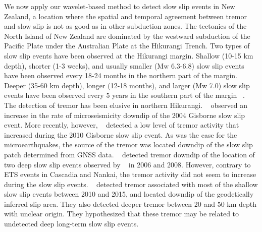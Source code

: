 \documentclass{article}
\begin{document}
We now apply our wavelet-based method to detect slow slip events in New Zealand, a location where the spatial and temporal agreement between tremor and slow slip is not as good as in other subduction zones. The tectonics of the North Island of New Zealand are dominated by the westward subduction of the Pacific Plate under the Australian Plate at the Hikurangi Trench. Two types of slow slip events have been observed at the Hikurangi margin. Shallow (10-15 km depth), shorter (1-3 weeks), and usually smaller (Mw 6.3-6.8) slow slip events have been observed every 18-24 months in the northern part of the margin. Deeper (35-60 km depth), longer (12-18 months), and larger (Mw 7.0) slow slip events have been observed every 5 years in the southern part of the margin ~\citep{WAL_2010,TOD_2016}. The detection of tremor has been elusive in northern Hikurangi. ~\citet{DEL_2009} observed an increase in the rate of microseismicity downdip of the 2004 Gisborne slow slip event. More recently, however, ~\citep{KIM_2011} detected a low level of tremor activity that increased during the 2010 Gisborne slow slip event. As was the case for the microearthquakes, the source of the tremor was located downdip of the slow slip patch determined from GNSS data. ~\citep{IDE_2012} detected tremor downdip of the location of two deep slow slip events observed by ~\citet{WAL_2013} in 2006 and 2008. However, contrary to ETS events in Cascadia and Nankai, the tremor activity did not seem to increase during the slow slip events. ~\citet{TOD_2016}  detected tremor associated with most of the shallow slow slip events between 2010 and 2015, and located downdip of the geodetically inferred slip area. They also detected deeper tremor between 20 and 50 km depth with unclear origin. They hypothesized that these tremor may be related to undetected deep long-term slow slip events. \\
\end{document}
